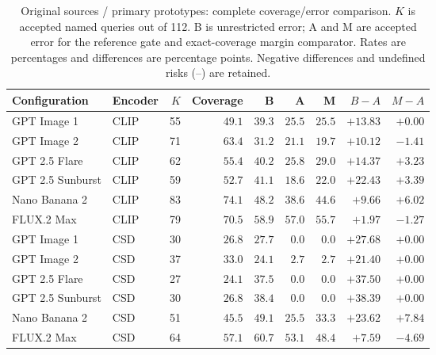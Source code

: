\begin{table}[!htbp]
\caption{Original sources / primary prototypes: complete coverage/error comparison. $K$ is accepted named queries out of 112. B is unrestricted error; A and M are accepted error for the reference gate and exact-coverage margin comparator. Rates are percentages and differences are percentage points. Negative differences and undefined risks (--) are retained.}
\label{tab:selective-risks-original-primary}
\centering\footnotesize\setlength{\tabcolsep}{3pt}
\begin{tabularx}{\linewidth}{@{}Xlrrrrrrr@{}}\toprule
Configuration & Encoder & $K$ & Coverage & B & A & M & $B-A$ & $M-A$\\\midrule
GPT Image 1 & CLIP & 55 & $49.1$ & $39.3$ & $25.5$ & $25.5$ & $+13.83$ & $+0.00$\\
GPT Image 2 & CLIP & 71 & $63.4$ & $31.2$ & $21.1$ & $19.7$ & $+10.12$ & $-1.41$\\
GPT 2.5 Flare & CLIP & 62 & $55.4$ & $40.2$ & $25.8$ & $29.0$ & $+14.37$ & $+3.23$\\
GPT 2.5 Sunburst & CLIP & 59 & $52.7$ & $41.1$ & $18.6$ & $22.0$ & $+22.43$ & $+3.39$\\
Nano Banana 2 & CLIP & 83 & $74.1$ & $48.2$ & $38.6$ & $44.6$ & $+9.66$ & $+6.02$\\
FLUX.2 Max & CLIP & 79 & $70.5$ & $58.9$ & $57.0$ & $55.7$ & $+1.97$ & $-1.27$\\
GPT Image 1 & CSD & 30 & $26.8$ & $27.7$ & $0.0$ & $0.0$ & $+27.68$ & $+0.00$\\
GPT Image 2 & CSD & 37 & $33.0$ & $24.1$ & $2.7$ & $2.7$ & $+21.40$ & $+0.00$\\
GPT 2.5 Flare & CSD & 27 & $24.1$ & $37.5$ & $0.0$ & $0.0$ & $+37.50$ & $+0.00$\\
GPT 2.5 Sunburst & CSD & 30 & $26.8$ & $38.4$ & $0.0$ & $0.0$ & $+38.39$ & $+0.00$\\
Nano Banana 2 & CSD & 51 & $45.5$ & $49.1$ & $25.5$ & $33.3$ & $+23.62$ & $+7.84$\\
FLUX.2 Max & CSD & 64 & $57.1$ & $60.7$ & $53.1$ & $48.4$ & $+7.59$ & $-4.69$\\
\bottomrule\end{tabularx}
\end{table}
